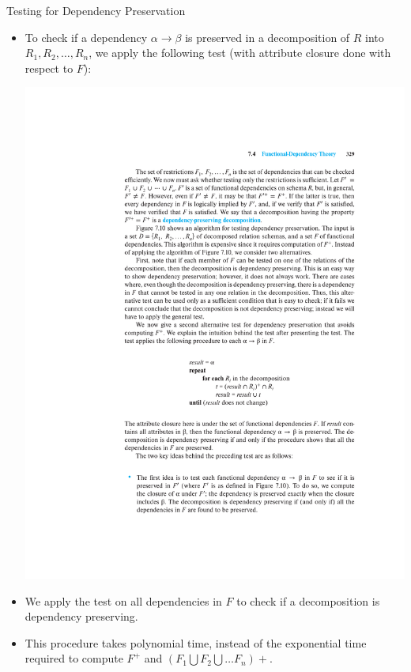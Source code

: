 \documentclass{beamer}
\begin{document}
\begin{frame}{Testing for Dependency Preservation}
    \begin{itemize}
        \item To check if a dependency $\alpha \rightarrow \beta$ is preserved in a decomposition of $R$ into $R_1, R_2, \ldots, R_n$, we apply the following test (with attribute closure done with respect to $F$):
            \begin{center}
                \includegraphics[width=\textwidth, trim={5cm 9.5cm 2.5cm 15.5cm}, clip]{figures/p329_Preserving}
            \end{center}
        \item We apply the test on all dependencies in $F$ to check if a decomposition is dependency preserving.
        \item This procedure takes polynomial time, instead of the exponential time required to compute $F^+$ and $(F_1 \bigcup F_2 \bigcup \ldots  F_n)+$.
    \end{itemize}
\end{frame}
\end{document}
